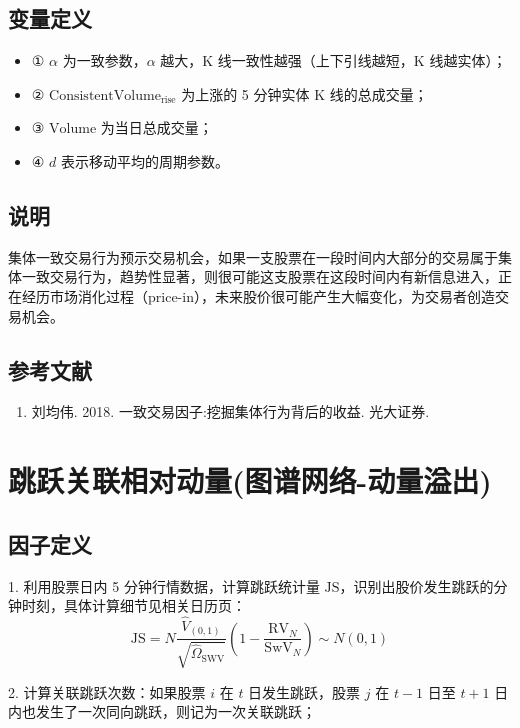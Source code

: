 \documentclass{article}
\begin{document}
\subsection{变量定义}
\begin{itemize}
    \item ① \( \alpha \) 为一致参数，\( \alpha \) 越大，K 线一致性越强（上下引线越短，K 线越实体）；
    \item ② \( \mathrm{ConsistentVolume}_{\mathrm{rise}} \) 为上涨的 5 分钟实体 K 线的总成交量；
    \item ③ \( \mathrm{Volume} \) 为当日总成交量；
    \item ④ \( d \) 表示移动平均的周期参数。
\end{itemize}

\subsection{说明}
集体一致交易行为预示交易机会，如果一支股票在一段时间内大部分的交易属于集体一致交易行为，趋势性显著，则很可能这支股票在这段时间内有新信息进入，正在经历市场消化过程（price-in），未来股价很可能产生大幅变化，为交易者创造交易机会。

\subsection{参考文献}
\begin{enumerate}
    \item 刘均伟. 2018. 一致交易因子:挖掘集体行为背后的收益. 光大证券.
\end{enumerate}

\section{跳跃关联相对动量(图谱网络-动量溢出)}

\subsection{因子定义}

1. 利用股票日内 5 分钟行情数据，计算跳跃统计量 \( \mathrm{JS} \)，识别出股价发生跳跃的分钟时刻，具体计算细节见相关日历页：
\begin{equation}
    \mathrm{JS} = N \frac{\hat{V}_{(0,1)}}{\sqrt{\hat{\Omega}_{\mathrm{SWV}}}} \left( 1 - \frac{\mathrm{RV}_N}{\mathrm{SwV}_N} \right) \sim N(0,1)
\end{equation}

2. 计算关联跳跃次数：如果股票 \( i \) 在 \( t \) 日发生跳跃，股票 \( j \) 在 \( t-1 \) 日至 \( t+1 \) 日内也发生了一次同向跳跃，则记为一次关联跳跃；
\end{document}

